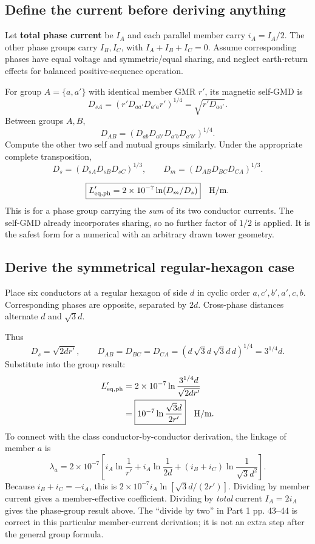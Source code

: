 \documentclass[11pt,a4paper]{article}
\newenvironment{Idea}[1]{\begin{tcolorbox}[colback=pale,colframe=teal,coltitle=white,title={#1}]}{\end{tcolorbox}}
\newcommand{\ans}[1]{\boxed{#1}}
\begin{document}
\subsection{Define the current before deriving anything}
Let \textbf{total phase current} be $I_A$ and each parallel member carry $i_A=I_A/2$. The other phase groups carry $I_B,I_C$, with $I_A+I_B+I_C=0$. Assume corresponding phases have equal voltage and symmetric/equal sharing, and neglect earth-return effects for balanced positive-sequence operation.

For group $A=\{a,a'\}$ with identical member GMR $r'$, its magnetic self-GMD is
\[
 D_{sA}=(r'D_{aa'}D_{a'a}r')^{1/4}=\sqrt{r'D_{aa'}}.
\]
Between groups $A,B$,
\[
 D_{AB}=(D_{ab}D_{ab'}D_{a'b}D_{a'b'})^{1/4}.
\]
Compute the other two self and mutual groups similarly. Under the appropriate complete transposition,
\[
 D_s=(D_{sA}D_{sB}D_{sC})^{1/3},\qquad
 D_m=(D_{AB}D_{BC}D_{CA})^{1/3}.
\]
\begin{Idea}{The general double-circuit result}
\[
 \ans{L'_{\rm eq,ph}=2\times10^{-7}\ln(D_m/D_s)}\quad\mathrm{H/m}.
\]
This is for a phase group carrying the \emph{sum} of its two conductor currents. The self-GMD already incorporates sharing, so no further factor of $1/2$ is applied. It is the safest form for a numerical with an arbitrary drawn tower geometry.
\end{Idea}
\subsection{Derive the symmetrical regular-hexagon case}
Place six conductors at a regular hexagon of side $d$ in cyclic order $a,c',b',a',c,b$. Corresponding phases are opposite, separated by $2d$. Cross-phase distances alternate $d$ and $\sqrt3d$.
\begin{center}
\end{center}
Thus
\[
 D_s=\sqrt{2dr'},\qquad
 D_{AB}=D_{BC}=D_{CA}=(d\,\sqrt3d\,\sqrt3d\,d)^{1/4}=3^{1/4}d.
\]
Substitute into the group result:
\[
 \begin{aligned}
 L'_{\rm eq,ph}
 &=2\times10^{-7}\ln\frac{3^{1/4}d}{\sqrt{2dr'}}\\
 &=\ans{10^{-7}\ln\frac{\sqrt3d}{2r'}}\quad\mathrm{H/m}.
 \end{aligned}
\]
To connect with the class conductor-by-conductor derivation, the linkage of member $a$ is
\[
 \lambda_a=2\times10^{-7}\left[
 i_A\ln\frac1{r'}+i_A\ln\frac1{2d}
 +(i_B+i_C)\ln\frac1{\sqrt3d^2}\right].
\]
Because $i_B+i_C=-i_A$, this is $2\times10^{-7}i_A\ln[\sqrt3d/(2r')]$. Dividing by member current gives a member-effective coefficient. Dividing by \emph{total} current $I_A=2i_A$ gives the phase-group result above. The ``divide by two'' in Part 1 pp. 43--44 is correct in this particular member-current derivation; it is not an extra step after the general group formula.
\end{document}
